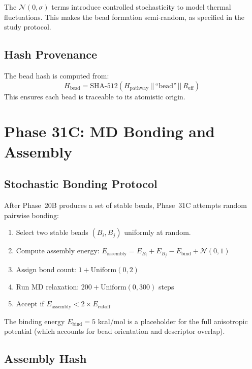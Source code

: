 \documentclass[11pt,a4paper]{article}
\begin{document}
\noindent The $\mathcal{N}(0, \sigma)$ terms introduce controlled
stochasticity to model thermal fluctuations.  This makes the bead
formation semi-random, as specified in the study protocol.

\subsection{Hash Provenance}

The bead hash is computed from:
\begin{equation}
  H_\text{bead} = \text{SHA-512}(H_\text{pathway} \,||\, \text{``bead''} \,||\, R_\text{eff})
\end{equation}
This ensures each bead is traceable to its atomistic origin.

\section{Phase 31C: MD Bonding and Assembly}
\label{sec:phase31C}

\subsection{Stochastic Bonding Protocol}

After Phase~20B produces a set of stable beads, Phase~31C attempts
random pairwise bonding:

\begin{enumerate}
  \item Select two stable beads $(B_i, B_j)$ uniformly at random.
  \item Compute assembly energy:
        $E_\text{assembly} = E_{B_i} + E_{B_j} - E_\text{bind} + \mathcal{N}(0, 1)$
  \item Assign bond count: $1 + \text{Uniform}(0, 2)$
  \item Run MD relaxation: $200 + \text{Uniform}(0, 300)$ steps
  \item Accept if $E_\text{assembly} < 2 \times E_\text{cutoff}$
\end{enumerate}

The binding energy $E_\text{bind} = 5$ kcal/mol is a placeholder for
the full anisotropic potential (which accounts for bead orientation
and descriptor overlap).

\subsection{Assembly Hash}
\end{document}
